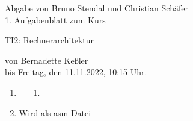 \documentclass[11pt]{article}
\newcommand{\VORLESUNG}{TI2: Rechnerarchitektur}
\newcommand{\STUDENTS}{Bruno Stendal und Christian Schäfer}
\newcommand{\STAFF}{Bernadette Keßler}
\newcommand{\ASSIGNMENT}{1}
\newcommand{\DELIVER}{Freitag, den 11.11.2022, 10:15 Uhr}
\newcommand{\aufgabe}[1]{\item{\bf #1}}
\begin{document}
\ofoot{\pagemark}
\begin{center}
    Abgabe von \STUDENTS{}\\
 \ASSIGNMENT{}. Aufgabenblatt  zum Kurs 
\vspace*{0.2cm}

{\Large \VORLESUNG{}}

{\small von \STAFF{} \\ bis \DELIVER{}.}
\vspace*{0.5cm}\\
\end{center}
\begin{enumerate}
\setcounter{enumi}{0}
\aufgabe{}
\begin{enumerate}
\item[1.]
\end{enumerate}
\aufgabe{} Wird als asm-Datei  
\end{enumerate}
\end{document}
